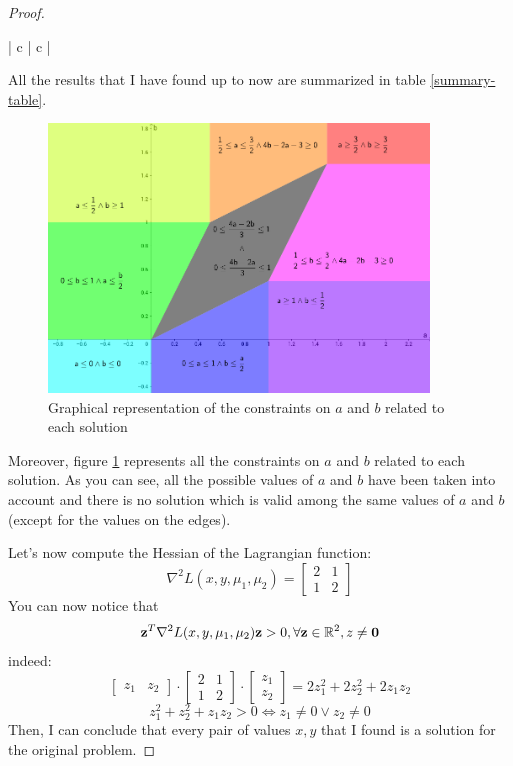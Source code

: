 \begin{proof}
\begin{table}
\begin{tabu}{| c | c |}
        \end{tabu}
        \caption{Summary of the results}
        \label{summary-table}
    \end{table}
    All the results that I have found up to now are summarized in table \ref{summary-table}.
    \begin{figure}
        \centering
        \includegraphics[width=0.9\textwidth]{../Images/a&b_partition.png}
        \caption{Graphical representation of the constraints on \(a\) and \(b\) related to each solution}
        \label{summary-graph}
    \end{figure}
    Moreover, figure \ref{summary-graph} represents all the constraints on \(a\) and \(b\) related to each solution. As you can see, all the possible values of \(a\) and \(b\) have been taken into account and there is no solution which is valid among the same values of \(a\) and \(b\) (except for the values on the edges).\par
    Let's now compute the Hessian of the Lagrangian function:
    \[
        \nabla^2 L(x,y,\mu_1,\mu_2) =
        \begin{bmatrix}
            2 & 1 \\
            1 & 2
        \end{bmatrix}
    \]
    You can now notice that
    \[\mathbf{z}^T \nabla^2 L(x,y,\mu_1,\mu_2) \mathbf{z} > 0, \forall \mathbf{z} \in \mathbb{R}^2, z \neq \mathbf{0}\]
    indeed:
    \[
        \begin{bmatrix}
            z_1 & z_2
        \end{bmatrix}
        \cdot
        \begin{bmatrix}
            2 & 1 \\
            1 & 2
        \end{bmatrix}
        \cdot
        \begin{bmatrix}
            z_1 \\
            z_2
        \end{bmatrix}
        = 2z_1^2 + 2z_2^2 + 2z_1z_2
    \]
    \[
        z_1^2 + z_2^2 + z_1z_2 > 0 \iff z_1 \neq 0 \lor z_2 \neq 0
    \]
    Then, I can conclude that every pair of values \(x,y\) that I found is a solution for the original problem.
\end{proof}